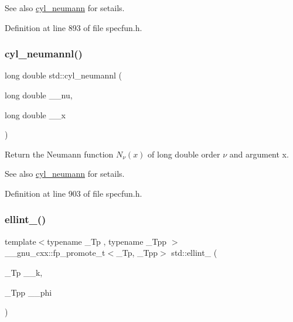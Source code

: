 \begin{DoxySeeAlso}{See also}
\hyperlink{group__mathsf__std_ga1e4bef23704469b0704cf15c5f04e29e}{cyl\+\_\+neumann} for setails. 
\end{DoxySeeAlso}


Definition at line 893 of file specfun.\+h.

\mbox{\label{group__mathsf__std_gaf8986bae9a523c48d861d233835bda8f}} 
\subsubsection{\texorpdfstring{cyl\+\_\+neumannl()}{cyl\_neumannl()}}
{\footnotesize\ttfamily long double std\+::cyl\+\_\+neumannl (\begin{DoxyParamCaption}\item[{long double}]{\+\_\+\+\_\+nu,  }\item[{long double}]{\+\_\+\+\_\+x }\end{DoxyParamCaption})\hspace{0.3cm}{\ttfamily [inline]}}

Return the Neumann function $ N_{\nu}(x) $ of {\ttfamily long double} order $ \nu $ and argument {\ttfamily x}.

\begin{DoxySeeAlso}{See also}
\hyperlink{group__mathsf__std_ga1e4bef23704469b0704cf15c5f04e29e}{cyl\+\_\+neumann} for setails. 
\end{DoxySeeAlso}


Definition at line 903 of file specfun.\+h.

\mbox{\label{group__mathsf__std_ga1550d6947bbbeee9865aabd398102a36}} 
\subsubsection{\texorpdfstring{ellint\+\_()}{ellint\_1()}}
{\footnotesize\ttfamily template$<$typename \+\_\+\+Tp , typename \+\_\+\+Tpp $>$ \\
\+\_\+\+\_\+gnu\+\_\+cxx\+::fp\+\_\+promote\+\_\+t$<$\+\_\+\+Tp, \+\_\+\+Tpp$>$ std\+::ellint\+\_ (\begin{DoxyParamCaption}\item[{\+\_\+\+Tp}]{\+\_\+\+\_\+k,  }\item[{\+\_\+\+Tpp}]{\+\_\+\+\_\+phi }\end{DoxyParamCaption})\hspace{0.3cm}{\ttfamily [inline]}}

